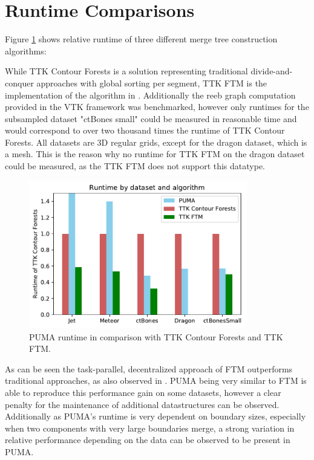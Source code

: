 \documentclass[%
	paper=A4,					%
	twoside=true,				%
	openright,					%
	parskip=full,				%
	chapterprefix=true,			%
	11pt,						%
	headings=normal,			%
	bibliography=totoc,			%
	listof=totoc,				%
	titlepage=on,				%
	captions=tableabove,		%
	draft=false,				%
]{scrreprt}%
\begin{document}
\section{Runtime Comparisons}
Figure \ref{fig:runtime} shows relative runtime of three different merge tree construction algorithms:

While TTK Contour Forests is a solution representing traditional divide-and-conquer approaches with global sorting per segment, TTK FTM is the implementation of the algorithm in \cite{FTM}. Additionally the reeb graph computation provided in the VTK framework was benchmarked, however only runtimes for the subsampled dataset "ctBones small" could be measured in reasonable time and would correspond to over two thousand times the runtime of TTK Contour Forests. All datasets are 3D regular grids, except for the dragon dataset, which is a mesh. This is the reason why no runtime for TTK FTM on the dragon dataset could be measured, as the TTK FTM does not support this datatype. 

\begin{figure}[h]
\centering
\includegraphics[width=0.85\textwidth]{figures/runtime.pdf}
\caption{PUMA runtime in comparison with TTK Contour Forests and TTK FTM.}
\label{fig:runtime}
\end{figure}

As can be seen the task-parallel, decentralized approach of FTM outperforms  traditional approaches, as also observed in \cite{FTM}. PUMA being very similar to FTM is able to reproduce this performance gain on some datasets, however a clear penalty for the maintenance of additional datastructures can be observed. Additionally as PUMA's runtime is very dependent on boundary sizes, especially when two components with very large boundaries merge, a strong variation in relative performance depending on the data can be observed to be present in PUMA. 
\end{document}
